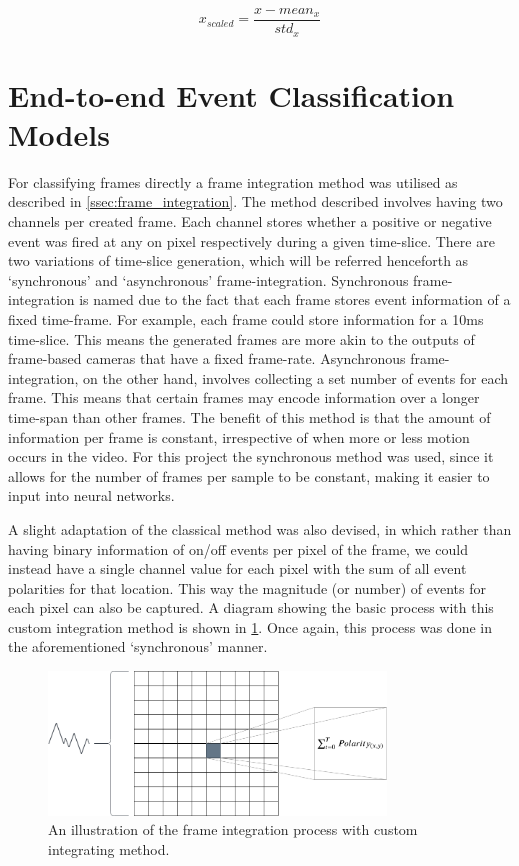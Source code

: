 \begin{equation}
    x_{scaled} = \frac{x - mean_x}{std_x}
    \label{eq:z_score}
\end{equation}

\section{End-to-end Event Classification Models} \label{sec:end_to_end_classification_design}

For classifying frames directly a frame integration method was utilised as described in \cref{ssec:frame_integration}. The method described involves having two channels per created frame. Each channel stores whether a positive or negative event was fired at any on pixel respectively during a given time-slice. There are two variations of time-slice generation, which will be referred henceforth as `synchronous' and `asynchronous' frame-integration. Synchronous frame-integration is named due to the fact that each frame stores event information of a fixed time-frame. For example, each frame could store information for a 10ms time-slice. This means the generated frames are more akin to the outputs of frame-based cameras that have a fixed frame-rate. Asynchronous frame-integration, on the other hand, involves collecting a set number of events for each frame. This means that certain frames may encode information over a longer time-span than other frames. The benefit of this method is that the amount of information per frame is constant, irrespective of when more or less motion occurs in the video. For this project the synchronous method was used, since it allows for the number of frames per sample to be constant, making it easier to input into neural networks.

A slight adaptation of the classical method was also devised, in which rather than having binary information of on/off events per pixel of the frame, we could instead have a single channel value for each pixel with the sum of all event polarities for that location. This way the magnitude (or number) of events for each pixel can also be captured. A diagram showing the basic process with this custom integration method is shown in \cref{fig:frame_integration_diagram}. Once again, this process was done in the aforementioned `synchronous' manner.

\begin{figure}[htb]
    \centering
    \includegraphics[width=0.8\textwidth]{analysisanddesign/images/frame_integration_illustration.png}
    \caption{An illustration of the frame integration process with custom integrating method.}
    \label{fig:frame_integration_diagram}
\end{figure}


